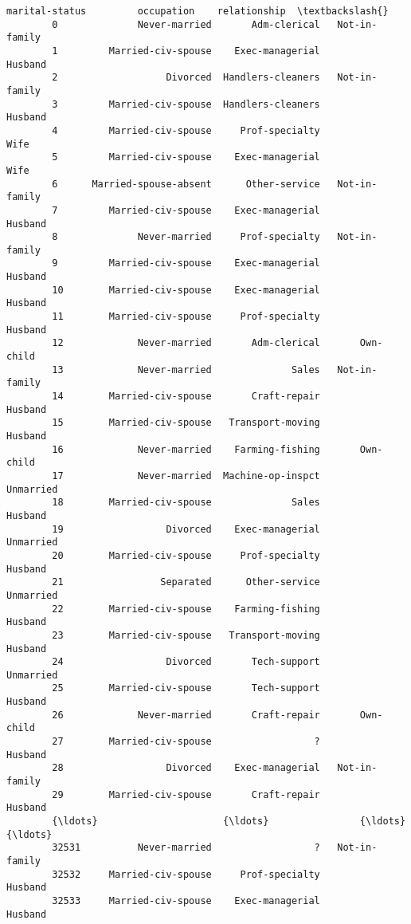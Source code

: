 \documentclass[11pt]{article}
\begin{document}
\begin{Verbatim}[commandchars=\\\{\}]
                      marital-status         occupation    relationship  \textbackslash{}
        0              Never-married       Adm-clerical   Not-in-family   
        1         Married-civ-spouse    Exec-managerial         Husband   
        2                   Divorced  Handlers-cleaners   Not-in-family   
        3         Married-civ-spouse  Handlers-cleaners         Husband   
        4         Married-civ-spouse     Prof-specialty            Wife   
        5         Married-civ-spouse    Exec-managerial            Wife   
        6      Married-spouse-absent      Other-service   Not-in-family   
        7         Married-civ-spouse    Exec-managerial         Husband   
        8              Never-married     Prof-specialty   Not-in-family   
        9         Married-civ-spouse    Exec-managerial         Husband   
        10        Married-civ-spouse    Exec-managerial         Husband   
        11        Married-civ-spouse     Prof-specialty         Husband   
        12             Never-married       Adm-clerical       Own-child   
        13             Never-married              Sales   Not-in-family   
        14        Married-civ-spouse       Craft-repair         Husband   
        15        Married-civ-spouse   Transport-moving         Husband   
        16             Never-married    Farming-fishing       Own-child   
        17             Never-married  Machine-op-inspct       Unmarried   
        18        Married-civ-spouse              Sales         Husband   
        19                  Divorced    Exec-managerial       Unmarried   
        20        Married-civ-spouse     Prof-specialty         Husband   
        21                 Separated      Other-service       Unmarried   
        22        Married-civ-spouse    Farming-fishing         Husband   
        23        Married-civ-spouse   Transport-moving         Husband   
        24                  Divorced       Tech-support       Unmarried   
        25        Married-civ-spouse       Tech-support         Husband   
        26             Never-married       Craft-repair       Own-child   
        27        Married-civ-spouse                  ?         Husband   
        28                  Divorced    Exec-managerial   Not-in-family   
        29        Married-civ-spouse       Craft-repair         Husband   
        {\ldots}                      {\ldots}                {\ldots}             {\ldots}   
        32531          Never-married                  ?   Not-in-family   
        32532     Married-civ-spouse     Prof-specialty         Husband   
        32533     Married-civ-spouse    Exec-managerial         Husband   

\end{Verbatim}
\end{document}
